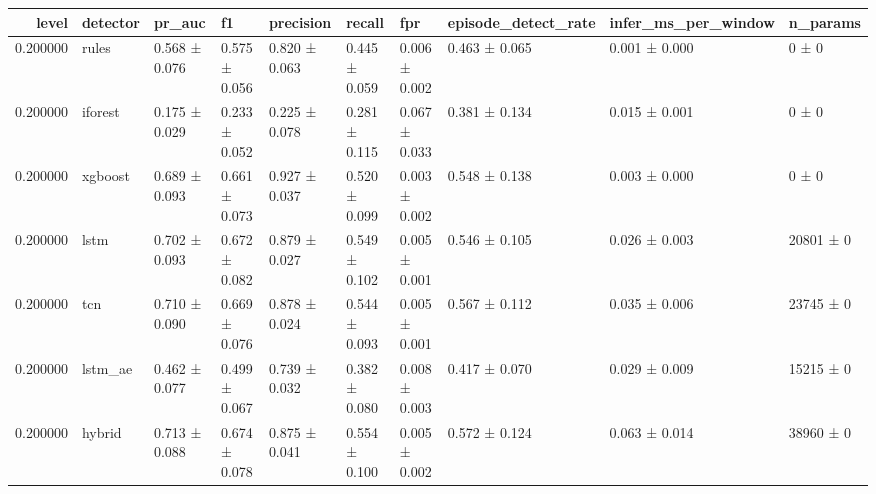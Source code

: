 \begin{tabular}{rlllllllll}
\toprule
level & detector & pr\_auc & f1 & precision & recall & fpr & episode\_detect\_rate & infer\_ms\_per\_window & n\_params \\
\midrule
0.200000 & rules & 0.568 ± 0.076 & 0.575 ± 0.056 & 0.820 ± 0.063 & 0.445 ± 0.059 & 0.006 ± 0.002 & 0.463 ± 0.065 & 0.001 ± 0.000 & 0 ± 0 \\
0.200000 & iforest & 0.175 ± 0.029 & 0.233 ± 0.052 & 0.225 ± 0.078 & 0.281 ± 0.115 & 0.067 ± 0.033 & 0.381 ± 0.134 & 0.015 ± 0.001 & 0 ± 0 \\
0.200000 & xgboost & 0.689 ± 0.093 & 0.661 ± 0.073 & 0.927 ± 0.037 & 0.520 ± 0.099 & 0.003 ± 0.002 & 0.548 ± 0.138 & 0.003 ± 0.000 & 0 ± 0 \\
0.200000 & lstm & 0.702 ± 0.093 & 0.672 ± 0.082 & 0.879 ± 0.027 & 0.549 ± 0.102 & 0.005 ± 0.001 & 0.546 ± 0.105 & 0.026 ± 0.003 & 20801 ± 0 \\
0.200000 & tcn & 0.710 ± 0.090 & 0.669 ± 0.076 & 0.878 ± 0.024 & 0.544 ± 0.093 & 0.005 ± 0.001 & 0.567 ± 0.112 & 0.035 ± 0.006 & 23745 ± 0 \\
0.200000 & lstm\_ae & 0.462 ± 0.077 & 0.499 ± 0.067 & 0.739 ± 0.032 & 0.382 ± 0.080 & 0.008 ± 0.003 & 0.417 ± 0.070 & 0.029 ± 0.009 & 15215 ± 0 \\
0.200000 & hybrid & 0.713 ± 0.088 & 0.674 ± 0.078 & 0.875 ± 0.041 & 0.554 ± 0.100 & 0.005 ± 0.002 & 0.572 ± 0.124 & 0.063 ± 0.014 & 38960 ± 0 \\
\bottomrule
\end{tabular}
